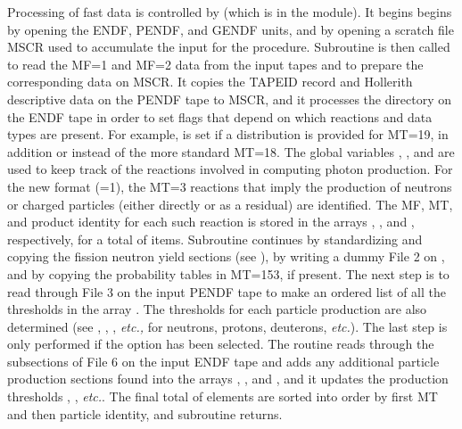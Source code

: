 Processing of fast data is controlled by 
 (which is in the
 module).
It begins begins by opening the ENDF, PENDF, and GENDF units, and
by opening a scratch file MSCR used to accumulate the input for
the  procedure.  Subroutine
 is then called to read
the MF=1 and MF=2 data from the input tapes and to prepare
the corresponding data on MSCR.  It copies the TAPEID record
and Hollerith descriptive data on the PENDF tape to MSCR, and it
processes the directory on the ENDF tape in order to set flags that
depend on which reactions and data types are present.  For example,
 is set if a distribution is provided for MT=19, in
addition or instead of the more standard MT=18.  The global variables
, , and  are used to keep track
of the reactions involved in computing photon production.  For the
new format (=1), the MT=3 reactions that imply the
production of neutrons or charged particles (either directly or as a
residual) are identified.  The MF, MT, and product identity for each
such reaction is stored in the arrays , ,
and , respectively, for a total of  items.
Subroutine  continues by standardizing and copying the
fission neutron yield sections (see ), by writing a
dummy File 2 on , and by copying the probability tables
in MT=153, if present.  The next step is to read through File 3
on the input PENDF tape to make an ordered list of all the thresholds
in the array .  The thresholds for each particle
production are also determined (see , ,
, {\it etc.,} for neutrons, protons, deuterons, {\it etc.}).
The last step is only performed if the  option has
been selected.  The routine reads through the subsections of File 6
on the input ENDF tape and adds any additional particle production
sections found into the arrays , , and
, and it updates the production thresholds ,
, {\it etc.}.  The final total of  elements
are sorted into order by first MT and then particle identity, and
subroutine  returns.

